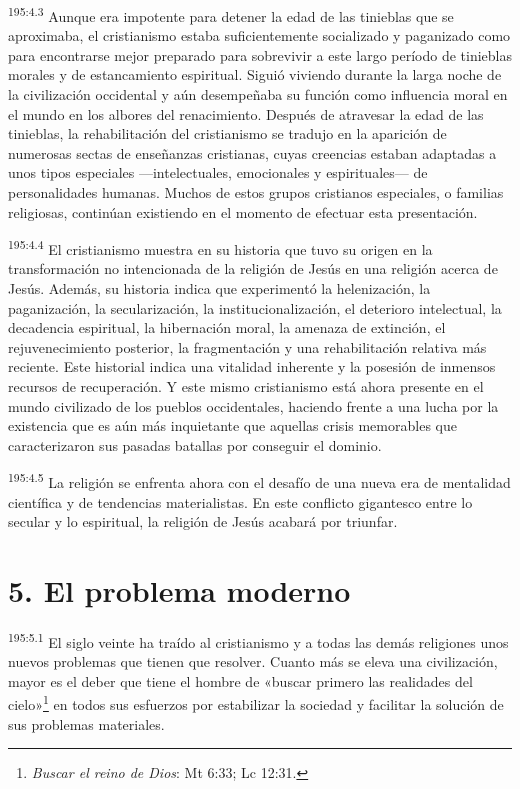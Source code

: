 \par 
\textsuperscript{195:4.3} Aunque era impotente para detener la edad de las tinieblas que se aproximaba, el cristianismo estaba suficientemente socializado y paganizado como para encontrarse mejor preparado para sobrevivir a este largo período de tinieblas morales y de estancamiento espiritual. Siguió viviendo durante la larga noche de la civilización occidental y aún desempeñaba su función como influencia moral en el mundo en los albores del renacimiento. Después de atravesar la edad de las tinieblas, la rehabilitación del cristianismo se tradujo en la aparición de numerosas sectas de enseñanzas cristianas, cuyas creencias estaban adaptadas a unos tipos especiales ---intelectuales, emocionales y espirituales--- de personalidades humanas. Muchos de estos grupos cristianos especiales, o familias religiosas, continúan existiendo en el momento de efectuar esta presentación.

\par 
\textsuperscript{195:4.4} El cristianismo muestra en su historia que tuvo su origen en la transformación no intencionada de la religión de Jesús en una religión acerca de Jesús. Además, su historia indica que experimentó la helenización, la paganización, la secularización, la institucionalización, el deterioro intelectual, la decadencia espiritual, la hibernación moral, la amenaza de extinción, el rejuvenecimiento posterior, la fragmentación y una rehabilitación relativa más reciente. Este historial indica una vitalidad inherente y la posesión de inmensos recursos de recuperación. Y este mismo cristianismo está ahora presente en el mundo civilizado de los pueblos occidentales, haciendo frente a una lucha por la existencia que es aún más inquietante que aquellas crisis memorables que caracterizaron sus pasadas batallas por conseguir el dominio.

\par 
\textsuperscript{195:4.5} La religión se enfrenta ahora con el desafío de una nueva era de mentalidad científica y de tendencias materialistas. En este conflicto gigantesco entre lo secular y lo espiritual, la religión de Jesús acabará por triunfar.

\section*{5. El problema moderno}
\par 
\textsuperscript{195:5.1} El siglo veinte ha traído al cristianismo y a todas las demás religiones unos nuevos problemas que tienen que resolver. Cuanto más se eleva una civilización, mayor es el deber que tiene el hombre de «buscar primero las realidades del cielo»\footnote{\textit{Buscar el reino de Dios}: Mt 6:33; Lc 12:31.} en todos sus esfuerzos por estabilizar la sociedad y facilitar la solución de sus problemas materiales.

